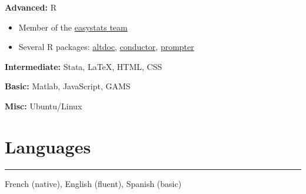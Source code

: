 \documentclass{article}
\newcommand{\sectionline}{%
  \vspace{-0.5cm}%
  \par\noindent\rule{\textwidth}{0.4pt}%
  \vspace{0.3cm}%
}
\let\xsection=\section
\renewcommand{\section}[1]{%
  \vspace{0.4cm}%
  \xsection*{#1}%
  \sectionline%
}
\begin{document}
\textbf{Advanced:} R

\begin{itemize}
\item
  Member of the \href{https://github.com/easystats/}{easystats team}
\item
  Several R packages:
  \href{https://github.com/etiennebacher/altdoc}{altdoc},
  \href{https://github.com/etiennebacher/conductor}{conductor},
  \href{https://github.com/etiennebacher/prompter}{prompter}
\end{itemize}

\textbf{Intermediate:} Stata, LaTeX, HTML, CSS

\textbf{Basic:} Matlab, JavaScript, GAMS

\textbf{Misc:} Ubuntu/Linux

\hypertarget{languages}{%
\section{Languages}\label{languages}}

French (native), English (fluent), Spanish (basic)
\end{document}
